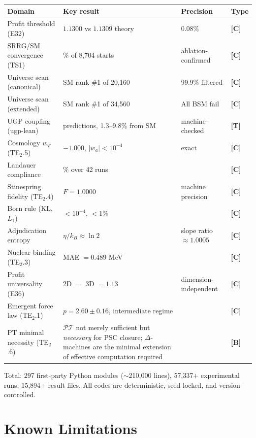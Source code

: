 \documentclass[11pt]{article}
\newcommand{\tagT}{\textbf{[T]}}
\newcommand{\tagB}{\textbf{[B]}}
\newcommand{\tagC}{\textbf{[C]}}
\theoremstyle{plain}
\theoremstyle{definition}
\theoremstyle{remark}
\begin{document}
\renewcommand{\arraystretch}{1.15}
\begin{tabularx}{\linewidth}{@{}l >{\RaggedRight\arraybackslash}X l l@{}}
\toprule
\textbf{Domain} & \textbf{Key result} & \textbf{Precision} & \textbf{Type} \\
\midrule
Profit threshold (E32) & $1.1300$ vs $1.1309$ theory & 0.08\% & \tagC{} \\
SRRG/SM convergence (TS1) & 97.02\% of 8,704 starts & ablation-confirmed & \tagC{} \\
Universe scan (canonical) & SM rank \#1 of 20,160 & 99.9\% filtered & \tagC{} \\
Universe scan (extended) & SM rank \#1 of 34,560 & All BSM fail & \tagC{} \\
UGP coupling (ugp-lean) & 3 predictions, 1.3--9.8\% from SM & machine-checked & \tagT{} \\
Cosmology $w_\Psi$ (TE$_2$.5) & $-1.000$, $|w_a| < 10^{-4}$ & exact & \tagC{} \\
Landauer compliance & 100\% over 42 runs & & \tagC{} \\
Stinespring fidelity (TE$_2$.4) & $F = 1.0000$ & machine precision & \tagC{} \\
Born rule (KL, $L_1$) & $< 10^{-4}$, $< 1\%$ & & \tagC{} \\
Adjudication entropy & $\eta/k_B \approx \ln 2$ & slope ratio $\approx 1.0005$ & \tagC{} \\
Nuclear binding (TE$_2$.3) & MAE $= 0.489$ MeV & & \tagC{} \\
Profit universality (E36) & 2D $=$ 3D $= 1.13$ & dimension-independent & \tagC{} \\
Emergent force law (TE$_2$.1) & $p = 2.60 \pm 0.16$, intermediate regime & & \tagC{} \\
PT minimal necessity (TE$_2$.6) & $\mathcal{PT}$ not merely sufficient but \emph{necessary} for PSC closure; $\Delta$-machines are the minimal extension of effective computation required & & \tagB{} \\
\bottomrule
\end{tabularx}

Total: 297 first-party Python modules ($\sim$210,000 lines), 57,337+ experimental runs,
15,894+ result files.
All codes are deterministic, seed-locked, and version-controlled.

\section{Known Limitations}
\label{sec:limitations}
\end{document}
